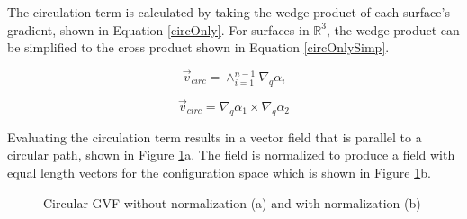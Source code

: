\documentclass[numbered,pdftex]{ohio-etd}
\begin{document}
The circulation term is calculated by taking the wedge product of each surface's gradient, shown in Equation \ref{circOnly}. For surfaces in $\mathbb{R}^3$, the wedge product can be simplified to the cross product shown in Equation \ref{circOnlySimp}.

\begin{equation}
\vec{v}_{circ} =  \wedge_{i=1}^{n-1}\nabla_q\alpha_i 
\label{circOnly}
\end{equation}

\begin{equation}
\vec{v}_{circ} =  \nabla_q\alpha_1 \times \nabla_q\alpha_2 
\label{circOnlySimp}
\end{equation}


Evaluating the circulation term results in a vector field that is parallel to a circular path, shown in Figure \ref{fig:gvfCircCirculation}a. The field is normalized to produce a field with equal length vectors for the configuration space which is shown in Figure \ref{fig:gvfCircCirculation}b. 

\begin{figure}[H]
	\begin{subfigmatrix}{2}%
		\centering	
		\hspace*{0mm}
	\end{subfigmatrix}
	\caption{Circular GVF without normalization (a) and with normalization (b)}
	\label{fig:gvfCircCirculation}
\end{figure}
\end{document}
